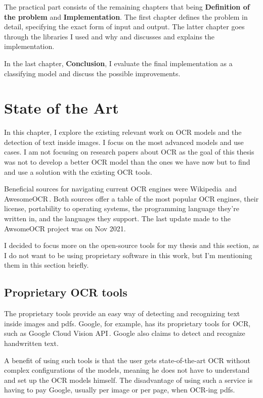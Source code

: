 \documentclass[
  digital,     %
  oneside,     %
  nosansbold,  %
  nocolorbold, %
  nolof,         %
  nolot,         %
]{fithesis4}
\begin{document}
The practical part consists of the remaining chapters that being \textbf{Definition of the problem} and \textbf{Implementation}. The first chapter defines the problem in detail, specifying the exact form of input and output. The latter chapter goes through the libraries I used and why and discusses and explains the implementation.

In the last chapter, \textbf{Conclusion}, I evaluate the final implementation as a classifying model and discuss the possible improvements.

\chapter{State of the Art}

In this chapter, I explore the existing relevant work on OCR models and the detection of text inside images. I focus on the most advanced models and use cases. I am not focusing on research papers about OCR as the goal of this thesis was not to develop a better OCR model than the ones we have now but to find and use a solution with the existing OCR tools.

Beneficial sources for navigating current OCR engines were Wikipedia\,\cite{ocrwikipedia} and AwesomeOCR\,\cite{awesomeocr}. Both sources offer a table of the most popular OCR engines, their license, portability to operating systems, the programming language they're written in, and the languages they support. The last update made to the AwsomeOCR project was on Nov 2021.

I decided to focus more on the open-source tools for my thesis and this section, as I do not want to be using proprietary software in this work, but I'm mentioning them in this section briefly.

\section{Proprietary OCR tools}

The proprietary tools provide an easy way of detecting and recognizing text inside images and pdfs. Google, for example, has its proprietary tools for OCR, such as Google Cloud Vision API\,\cite{googleapi}. Google also claims to detect and recognize handwritten text.

A benefit of using such tools is that the user gets state-of-the-art OCR without complex configurations of the models, meaning he does not have to understand and set up the OCR models himself. The disadvantage of using such a service is having to pay Google, usually per image or per page, when OCR-ing pdfs.
\end{document}
